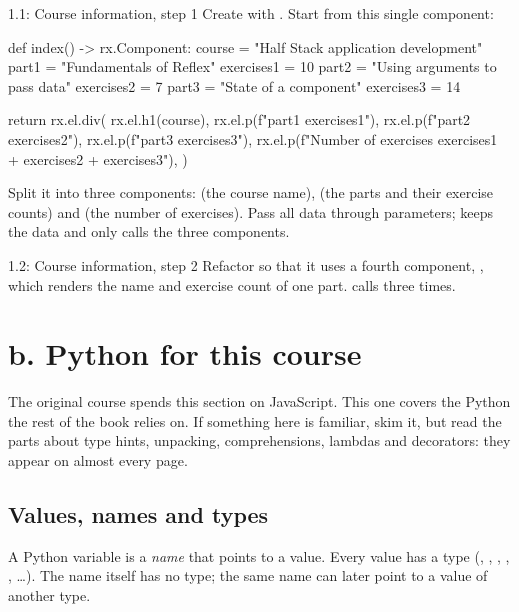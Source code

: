 \begin{exercise}{1.1: Course information, step 1}
Create  with . Start from this single component:

\begin{py}
def index() -> rx.Component:
	course = "Half Stack application development"
	part1 = "Fundamentals of Reflex"
	exercises1 = 10
	part2 = "Using arguments to pass data"
	exercises2 = 7
	part3 = "State of a component"
	exercises3 = 14

	return rx.el.div(
		rx.el.h1(course),
		rx.el.p(f"{part1} {exercises1}"),
		rx.el.p(f"{part2} {exercises2}"),
		rx.el.p(f"{part3} {exercises3}"),
		rx.el.p(f"Number of exercises {exercises1 + exercises2 + exercises3}"),
	)
\end{py}

Split it into three components:  (the course name),  (the parts and their exercise counts) and  (the number of exercises). Pass all data through parameters;  keeps the data and only calls the three components.
\end{exercise}

\begin{exercise}{1.2: Course information, step 2}
Refactor  so that it uses a fourth component, , which renders the name and exercise count of one part.  calls  three times.
\end{exercise}

\section{b. Python for this course}

The original course spends this section on JavaScript. This one covers the Python the rest of the book relies on. If something here is familiar, skim it, but read the parts about type hints, unpacking, comprehensions, lambdas and decorators: they appear on almost every page.

\subsection{Values, names and types}

A Python variable is a \emph{name} that points to a value. Every value has a type (, , , , , \ldots). The name itself has no type; the same name can later point to a value of another type.

